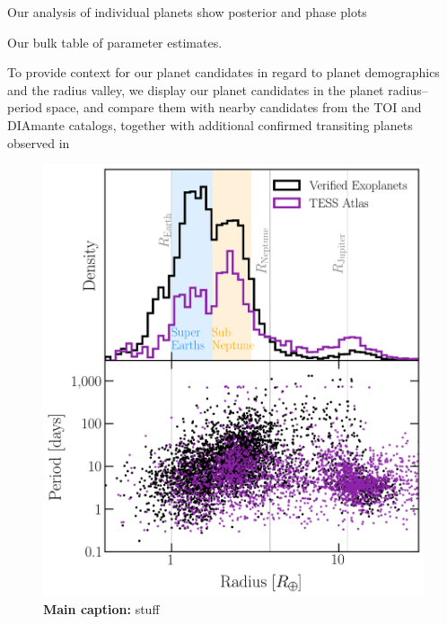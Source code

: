 \documentclass[floatfix,ApJL,twocolumn]{aastex631}
\begin{document}
Our analysis of individual planets show posterior and phase plots


Our bulk table of parameter estimates.







To provide context for our planet candidates in regard to
planet demographics and the radius valley, we display our
planet candidates in the planet radius–period space, and compare them with nearby candidates from the TOI and DIAmante catalogs, together with additional confirmed transiting planets observed in



\begin{figure}
  \includegraphics[width=\linewidth]{figures/radius_period_plot.png}
  \caption{\textbf{Main caption:} stuff }
  \label{fig:}
\end{figure}
\end{document}
